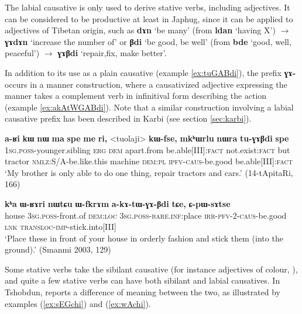 \documentclass[oneside,a4paper,11pt]{article}
\newcommand{\ipa}[1]{\textbf{{\phon\mbox{#1}}}} %
\newcommand{\forme}[2]{\ipa{#1} `#2'}
\newcommand{\refb}[1]{(\ref{#1})}
\begin{document}
The labial causative is only used to derive stative verbs, including adjectives. It can be considered to be  productive at least in Japhug, since it can be applied to adjectives of Tibetan origin, such as \forme{dɤn}{be many} (from \forme{ldan}{having X}) $\rightarrow$ \forme{ɣɤdɤn}{increase the number of} or \forme{βdi}{be good, be well} (from \forme{bde}{good, well, peaceful}) $\rightarrow$ \forme{ɣɤβdi}{repair,fix, make better}.

In addition to its use as a plain causative (example \ref{ex:tuGABdi}), the prefix \ipa{ɣɤ-} occurs in a manner construction, where a causativized adjective expressing the manner takes a complement verb in infinitival form describing the action (example \ref{ex:akAtWGABdi}). Note that a similar construction involving a labial causative prefix has been described in Karbi (see section \ref{sec:karbi}).

\begin{exe}
\ex \label{ex:tuGABdi}
 \gll \ipa{a-ʁi} 	\ipa{kɯ} 	\ipa{nɯ} 	\ipa{ma} 	\ipa{spe} 	\ipa{me} 	\ipa{ri,} 	<tuolaji> 	\ipa{kɯ-fse,} 	\ipa{mkʰɯrlu} 	\ipa{nɯra} 	\ipa{tu-ɣɤβdi} 	\ipa{spe} \\
 \textsc{1sg.poss}-younger.sibling \textsc{erg} \textsc{dem} apart.from be.able[III]:\textsc{fact} not.exist:\textsc{fact} but tractor \textsc{nmlz}:S/A-be.like.this machine \textsc{dem:pl} \textsc{ipfv-caus}-be.good be.able[III]:\textsc{fact} \\
 \glt `My brother is only able to do one thing, repair tractors and cars.' (14-tApitaRi, 166)
\end{exe}

\begin{exe}
\ex \label{ex:akAtWGABdi}
\gll \ipa{kʰa} 	\ipa{ɯ-ʁɤri} 	\ipa{nɯtɕu} 	\ipa{ɯ-fkrɤm} 	\ipa{a-kɤ-tɯ-ɣɤ-βdi} 	\ipa{tɕe,} 	\ipa{ɕ-pɯ-sɤtse} \\
house \textsc{3sg.poss}-front.of \textsc{dem:loc} \textsc{3sg.poss-bare.inf}:place \textsc{irr-pfv-2-caus}-be.good \textsc{lnk} \textsc{transloc-imp}-stick.into[III] \\
\glt `Place these in front of your house in orderly fashion and stick them (into the ground).' (Smanmi 2003, 129)
\end{exe}


Some stative verbs take the sibilant causative (for instance adjectives of colour, \citealt[183]{jacques15causative}), and quite a few stative verbs can have both sibilant and labial causatives. In Tshobdun, \citet{jackson06paisheng, jackson14morpho} reports a difference of meaning between the two, as illustrated by examples \refb{ex:sEGchi} and \refb{ex:wAchi}.
\end{document}

